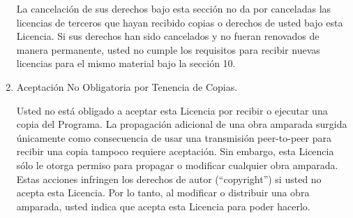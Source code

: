 \documentclass[11pt]{article}
\begin{document}
\begin{enumerate}
La cancelaci\'{o}n de sus derechos bajo esta secci\'{o}n no da por
canceladas las licencias de terceros que hayan recibido copias o
derechos de usted bajo esta Licencia.  Si sus derechos han sido
cancelados y no fueran renovados de manera permanente, usted no
cumple los requisitos para recibir nuevas licencias para el mismo
material bajo la secci\'{o}n 10.

\item Aceptaci\'{o}n No Obligatoria por Tenencia de Copias.

Usted no está obligado a aceptar esta Licencia por recibir o
ejecutar una copia del Programa.  La propagaci\'{o}n adicional de una obra amparada surgida \'{u}nicamente como consecuencia de usar una transmisión peer-to-peer para recibir una copia tampoco requiere aceptaci\'{o}n.  Sin embargo, esta Licencia s\'{o}lo le otorga
permiso para propagar o modificar cualquier obra amparada.  Estas
acciones infringen los derechos de autor (``copyright'') si usted no acepta esta Licencia.  Por lo tanto, al modificar o distribuir una obra amparada, usted
indica que acepta esta Licencia para poder hacerlo.

\end{enumerate}
\end{document}
